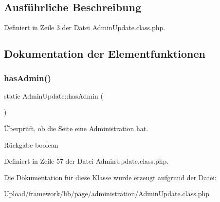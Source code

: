 \subsection{Ausführliche Beschreibung}


Definiert in Zeile 3 der Datei Admin\+Update.\+class.\+php.



\subsection{Dokumentation der Elementfunktionen}
\mbox{\label{class_admin_update_a98628470dc9944743291ae99ca2a8f2c}} 
\subsubsection{\texorpdfstring{has\+Admin()}{hasAdmin()}}
{\footnotesize\ttfamily static Admin\+Update\+::has\+Admin (\begin{DoxyParamCaption}{ }\end{DoxyParamCaption})\hspace{0.3cm}{\ttfamily [static]}}

Überprüft, ob die Seite eine Administration hat. \begin{DoxyReturn}{Rückgabe}
boolean 
\end{DoxyReturn}


Definiert in Zeile 57 der Datei Admin\+Update.\+class.\+php.



Die Dokumentation für diese Klasse wurde erzeugt aufgrund der Datei\+:\begin{DoxyCompactItemize}
\item 
Upload/framework/lib/page/administration/Admin\+Update.\+class.\+php\end{DoxyCompactItemize}
